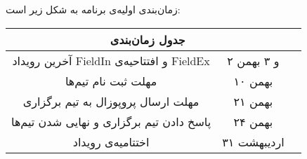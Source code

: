 \documentclass{article}
\begin{document}
زمان‌بندی اولیه‌ی برنامه به شکل زیر است:

\bgroup
\def\arraystretch{1.5}
\begin{table}[h]
\centering
\begin{tabular}{|c|c|c|}
\hline
\multicolumn{2}{|c|}{جدول زمان‌بندی} \\ \hline
آخرین رویداد FieldIn و افتتاحیه‌ی FieldEx
  & ۲ و ۳ بهمن
\\ \hline
مهلت ثبت نام تیم‌ها 
& ۱۰ بهمن
\\ \hline
مهلت ارسال پروپوزال به تیم برگزاری 
& ۲۱ بهمن
\\ \hline
پاسخ دادن تیم برگزاری و نهایی شدن تیم‌ها 
& ۲۴ بهمن
\\ \hline
اختتامیه‌ی رویداد
& ۳۱ اردیبهشت
\\ \hline
\end{tabular}
\end{table}
\egroup
\end{document}
